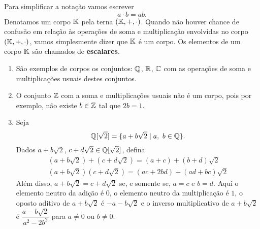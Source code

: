 Para simplificar a nota\c{c}\~ao vamos escrever
\[
a \cdot b = ab.
\]
Denotamos um corpo $\mathbb{K}$ pela terna $(\mathbb{K}, +, \cdot)$. Quando n\~ao houver chance de confus\~ao em rela\c{c}\~ao \`as opera\c{c}\~oes de soma e multiplica\c{c}\~ao envolvidas no corpo $(\mathbb{K}, +, \cdot)$, vamos simplesmente dizer que $\mathbb{K}$ \'e um corpo. Os elementos de um corpo $\mathbb{K}$ s\~ao chamados de \textbf{escalares}.

\begin{exemplo}
\begin{enumerate}
	\item S\~ao exemplos de corpos os conjuntos: $\mathbb{Q}$, $\mathbb{R}$, $\mathbb{C}$ com as opera\c{c}\~oes de soma e multiplica\c{c}\~oes usuais destes conjuntos.

	\item O conjunto $\mathbb{Z}$ com a soma e multiplica\c{c}\~oes usuais n\~ao \'e um corpo, pois por exemplo, n\~ao existe $b \in \mathbb{Z}$ tal que $2b = 1$.

	\item Seja
	\[
	\mathbb{Q}{[\sqrt{2}]} = \{a + b\sqrt{2} \mid a,\ b \in \mathbb{Q}\}.
	\]
	Dados $a + b\sqrt{2}$, $c + d\sqrt{2} \in \mathbb{Q}{[\sqrt{2}]}$, defina
	\begin{align*}
	(a + b\sqrt{2}) + (c + d\sqrt{2}) = (a + c) + (b + d)\sqrt{2}\\
	(a + b\sqrt{2})(c + d\sqrt{2}) = (ac + 2bd) + (ad + bc)\sqrt{2}
	\end{align*}
	Al\'em disso, $a + b\sqrt{2} = c + d\sqrt{2}$ se, e somente se, $a = c$ e $b = d$.
	Aqui o elemento neutro da adi\c{c}\~ao \'e $0$, o elemento neutro da multiplica\c{c}\~ao \'e $1$, o oposto aditivo de $a + b\sqrt{2}$ \'e $-a - b\sqrt{2}$ e o inverso multiplicativo de $a + b\sqrt{2}$ \'e $\dfrac{a - b\sqrt{2}}{a^2 - 2b^2}$ para $a \ne 0$ ou $b \ne 0$.

\end{enumerate}
\end{exemplo}


